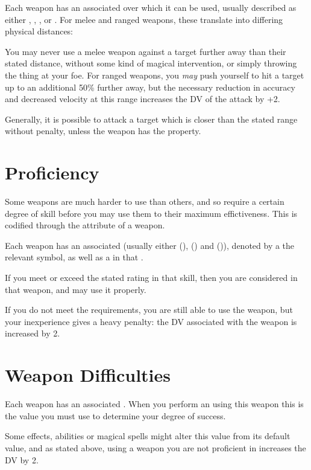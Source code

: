 Each weapon has an associated  over which it can be used, usually described as either , , ,  or . For melee and ranged weapons, these translate into differing physical distances:

\rangetable{}

You may never use a melee weapon against a target further away than their stated distance, without some kind of magical intervention, or simply throwing the thing at your foe. For ranged weapons, you {\it may} push yourself to hit a target up to an additional 50\% further away, but the necessary reduction in accuracy and decreased velocity at this range increases the DV of the attack by +2. 

Generally, it is possible to attack a target which is closer than the stated range without penalty, unless the weapon has the  property.
\section{Proficiency}

Some weapons are much harder to use than others, and so require a certain degree of skill before you may use them to their maximum effictiveness. This is codified through the  attribute of a weapon. 

Each weapon has an associated  (usually either  (\brawl),  (\skirmish) and  (\marksman)), denoted by a the relevant symbol, as well as a  in that . 

If you meet or exceed the stated rating in that skill, then you are considered  in that weapon, and may use it properly. 

If you do not meet the requirements, you are still able to use the weapon, but your inexperience gives a heavy penalty: the DV associated with the weapon is increased by 2. 


\section{Weapon Difficulties}

Each weapon has an associated . When you perform an  using this weapon this is the value you must use to determine your degree of success. 

Some effects, abilities or magical spells might alter this value from its default value, and as stated above, using a weapon you are not proficient in increases the DV by 2. 

